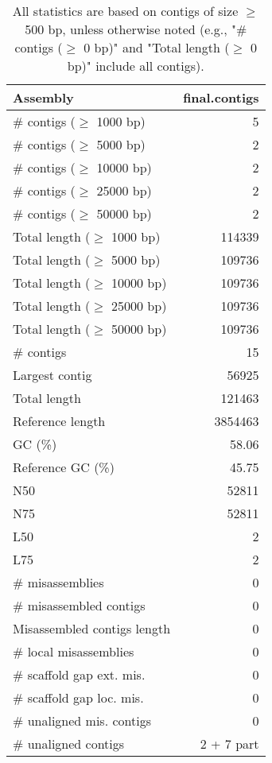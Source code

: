 \documentclass[12pt,a4paper]{article}
\begin{document}
\begin{table}[ht]
\begin{center}
\caption{All statistics are based on contigs of size $\geq$ 500 bp, unless otherwise noted (e.g., "\# contigs ($\geq$ 0 bp)" and "Total length ($\geq$ 0 bp)" include all contigs).}
\begin{tabular}{|l*{1}{|r}|}
\hline
Assembly & final.contigs \\ \hline
\# contigs ($\geq$ 1000 bp) & 5 \\ \hline
\# contigs ($\geq$ 5000 bp) & 2 \\ \hline
\# contigs ($\geq$ 10000 bp) & 2 \\ \hline
\# contigs ($\geq$ 25000 bp) & 2 \\ \hline
\# contigs ($\geq$ 50000 bp) & 2 \\ \hline
Total length ($\geq$ 1000 bp) & 114339 \\ \hline
Total length ($\geq$ 5000 bp) & 109736 \\ \hline
Total length ($\geq$ 10000 bp) & 109736 \\ \hline
Total length ($\geq$ 25000 bp) & 109736 \\ \hline
Total length ($\geq$ 50000 bp) & 109736 \\ \hline
\# contigs & 15 \\ \hline
Largest contig & 56925 \\ \hline
Total length & 121463 \\ \hline
Reference length & 3854463 \\ \hline
GC (\%) & 58.06 \\ \hline
Reference GC (\%) & 45.75 \\ \hline
N50 & 52811 \\ \hline
N75 & 52811 \\ \hline
L50 & 2 \\ \hline
L75 & 2 \\ \hline
\# misassemblies & 0 \\ \hline
\# misassembled contigs & 0 \\ \hline
Misassembled contigs length & 0 \\ \hline
\# local misassemblies & 0 \\ \hline
\# scaffold gap ext. mis. & 0 \\ \hline
\# scaffold gap loc. mis. & 0 \\ \hline
\# unaligned mis. contigs & 0 \\ \hline
\# unaligned contigs & 2 + 7 part \\ \hline

\end{tabular}
\end{center}
\end{table}
\end{document}
